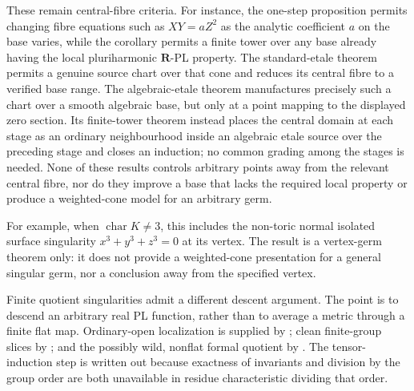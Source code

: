 



These remain central-fibre criteria.  For instance, the one-step proposition
permits changing fibre equations such as \(XY=aZ^2\) as the analytic
coefficient \(a\) on the base varies, while the corollary permits a finite
tower over any base already having the local pluriharmonic
\(\mathbf R\)-PL property.  The standard-etale theorem permits a genuine
source chart over that cone and reduces its central fibre to a verified
base range.  The algebraic-etale theorem manufactures precisely such a chart
over a smooth algebraic base, but only at a point mapping to the displayed
zero section.  Its finite-tower theorem instead places the central domain
at each stage as an ordinary neighbourhood inside an algebraic etale source
over the preceding stage and closes an induction; no common grading among
the stages is needed.  None of these
results controls arbitrary points away from the
relevant central fibre, nor do they improve a base that lacks the required
local property or produce a weighted-cone model for an arbitrary germ.

For example, when \(\operatorname{char}K\ne 3\), this includes the non-toric
normal isolated surface singularity \(x^3+y^3+z^3=0\) at its vertex.  The
result is a vertex-germ theorem only:
it does not provide a weighted-cone presentation for a general singular germ,
nor a conclusion away from the specified vertex.

Finite quotient singularities admit a different descent argument.  The
point is to descend an arbitrary real PL function, rather than to average a
metric through a finite flat map.  Ordinary-open localization is supplied by
\cite[Proposition~5.8]{GJR26}; clean finite-group slices by
\cite[Lemma~5.2 and Theorem~5.3]{HansenJohansson23}; and the possibly wild,
nonflat formal quotient by
\cite[Remark~3.3.3 and Theorems~3.3.4 and~4.4.1]{Zavyalov24Quotients}.
The tensor-induction step is written out because exactness of invariants and
division by the group order are both unavailable in residue characteristic
dividing that order.




